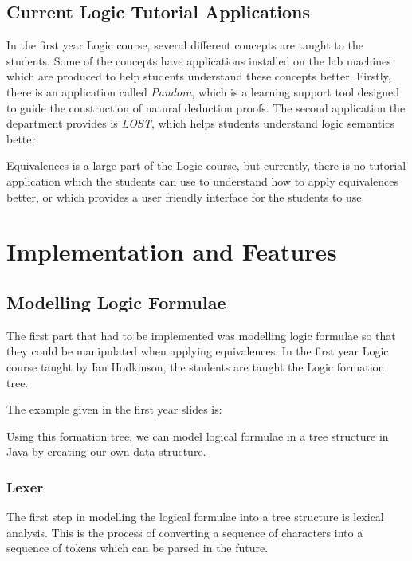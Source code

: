\documentclass{report}
\begin{document}
\section{Current Logic Tutorial Applications}

In the first year Logic course, several different concepts are taught to the students.
Some of the concepts have applications installed on the lab machines which are produced
to help students understand these concepts better. Firstly, there is an application
called \emph{Pandora}, which is a learning support tool designed to guide the
construction of natural deduction proofs. The second application the department
provides is \emph{LOST}, which helps students understand logic semantics better. 

Equivalences is a large part of the Logic course, but currently, there is no
tutorial application which the students can use to understand how to apply
equivalences better, or which provides a user friendly interface for the students 
to use. 


\chapter{Implementation and Features}

\section{Modelling Logic Formulae}

The first part that had to be implemented was modelling logic formulae so that
they could be manipulated when applying equivalences. In the first year Logic course
taught by Ian Hodkinson, the students are taught the Logic formation tree.

The example given in the first year slides is:

Using this formation tree, we can model logical formulae in a tree structure in
Java by creating our own data structure.

\subsection{Lexer}

The first step in modelling the logical formulae into a tree structure is lexical 
analysis. This is the process of converting a sequence of characters into a sequence
of tokens which can be parsed in the future.
\end{document}

